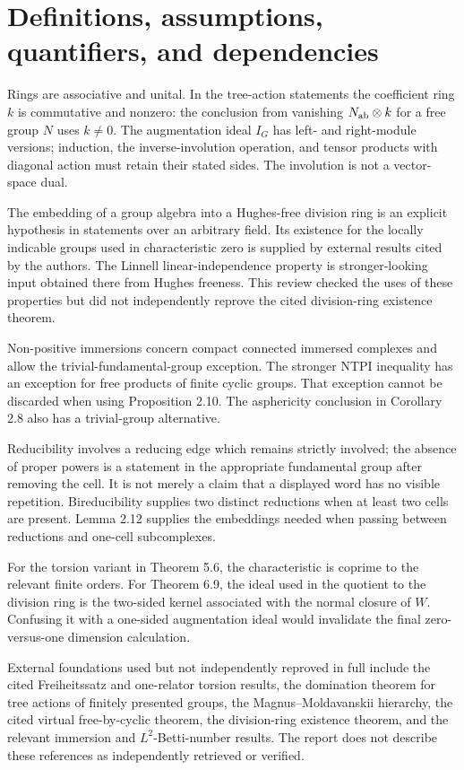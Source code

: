 \documentclass[10pt]{article}
\begin{document}
\section*{Definitions, assumptions, quantifiers, and dependencies}
Rings are associative and unital. In the tree-action statements the coefficient ring \(k\) is commutative and nonzero: the conclusion from vanishing \(N_{\rm ab}\otimes k\) for a free group \(N\) uses \(k\ne0\). The augmentation ideal \(I_G\) has left- and right-module versions; induction, the inverse-involution operation, and tensor products with diagonal action must retain their stated sides. The involution is not a vector-space dual.\par
The embedding of a group algebra into a Hughes-free division ring is an explicit hypothesis in statements over an arbitrary field. Its existence for the locally indicable groups used in characteristic zero is supplied by external results cited by the authors. The Linnell linear-independence property is stronger-looking input obtained there from Hughes freeness. This review checked the uses of these properties but did not independently reprove the cited division-ring existence theorem.\par
Non-positive immersions concern compact connected immersed complexes and allow the trivial-fundamental-group exception. The stronger NTPI inequality has an exception for free products of finite cyclic groups. That exception cannot be discarded when using Proposition 2.10. The asphericity conclusion in Corollary 2.8 also has a trivial-group alternative.\par
Reducibility involves a reducing edge which remains strictly involved; the absence of proper powers is a statement in the appropriate fundamental group after removing the cell. It is not merely a claim that a displayed word has no visible repetition. Bireducibility supplies two distinct reductions when at least two cells are present. Lemma 2.12 supplies the embeddings needed when passing between reductions and one-cell subcomplexes.\par
For the torsion variant in Theorem 5.6, the characteristic is coprime to the relevant finite orders. For Theorem 6.9, the ideal used in the quotient to the division ring is the two-sided kernel associated with the normal closure of \(W\). Confusing it with a one-sided augmentation ideal would invalidate the final zero-versus-one dimension calculation.\par
External foundations used but not independently reproved in full include the cited Freiheitssatz and one-relator torsion results, the domination theorem for tree actions of finitely presented groups, the Magnus–Moldavanskii hierarchy, the cited virtual free-by-cyclic theorem, the division-ring existence theorem, and the relevant immersion and \(L^2\)-Betti-number results. The report does not describe these references as independently retrieved or verified.\par
\end{document}
